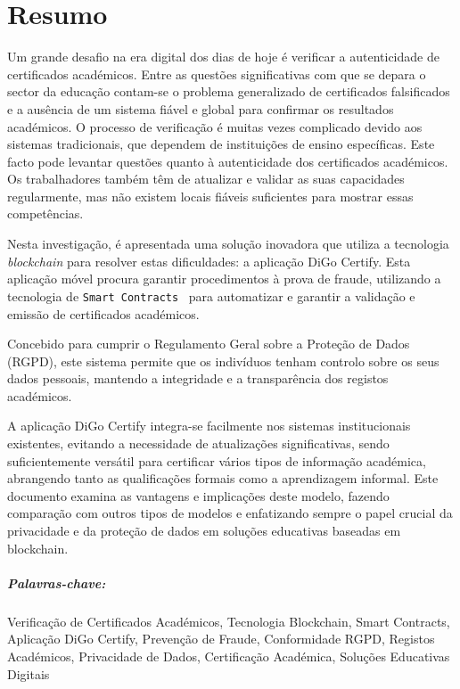 %
%
\chapter*{Resumo}\label{chap:resumo}

Um grande desafio na era digital dos dias de hoje é verificar a autenticidade de certificados académicos. Entre as questões significativas com que se depara o sector da educação contam-se o problema generalizado de certificados falsificados e a ausência de um sistema fiável e global para confirmar os resultados académicos.
O processo de verificação é muitas vezes complicado devido aos sistemas tradicionais, que dependem de instituições de ensino específicas.
Este facto pode levantar questões quanto à autenticidade dos certificados académicos. Os trabalhadores também têm de atualizar e validar as suas capacidades regularmente, mas não existem locais fiáveis suficientes para mostrar essas competências.

Nesta investigação, é apresentada uma solução inovadora que utiliza a tecnologia \textit{blockchain} para resolver estas dificuldades: a aplicação DiGo Certify. Esta aplicação móvel procura garantir procedimentos à prova de fraude, utilizando a tecnologia de \texttt{Smart Contracts}~\cite{vigliotti2021we} para automatizar e garantir a validação e emissão de certificados académicos.

Concebido para cumprir o Regulamento Geral sobre a Proteção de Dados (RGPD), este sistema permite que os indivíduos tenham controlo sobre os seus dados pessoais, mantendo a integridade e a transparência dos registos académicos.

A aplicação DiGo Certify integra-se facilmente nos sistemas institucionais existentes, evitando a necessidade de atualizações significativas, sendo suficientemente versátil para certificar vários tipos de informação académica, abrangendo tanto as qualificações formais como a aprendizagem informal.
Este documento examina as vantagens e implicações deste modelo, fazendo comparação com outros tipos de modelos e enfatizando sempre o papel crucial da privacidade e da proteção de dados em soluções educativas baseadas em blockchain.

\paragraph{Palavras-chave:} Verificação de Certificados Académicos, Tecnologia Blockchain, Smart Contracts, Aplicação DiGo Certify, Prevenção de Fraude, Conformidade RGPD, Registos Académicos, Privacidade de Dados, Certificação Académica, Soluções Educativas Digitais